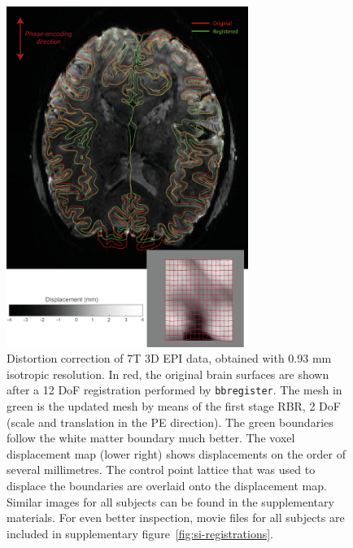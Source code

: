 \begin{figure}[!t]
\centering
\includegraphics[width=0.7\textwidth, clip=true]{./Chapters/02_Registration/Images/./EpiRegistration}
\caption{
	Distortion correction of 7T 3D EPI data, obtained with 0.93 mm isotropic resolution. In {\color{red}red}, the original brain surfaces are shown after a 12 DoF registration performed by \texttt{bbregister}. The mesh in {\color{green}green} is the updated mesh by means of the first stage RBR, 2 DoF (scale and translation in the PE direction). The green boundaries follow the white matter boundary much better. The voxel displacement map (lower right) shows displacements on the order of several millimetres. The control point lattice that was used to displace the boundaries are overlaid onto the displacement map. Similar images for all subjects can be found in the supplementary materials. For even better inspection, movie files for all subjects are included in supplementary figure~\ref{fig:si-registrations}.} 
\label{fig:epiregistration}
\end{figure}